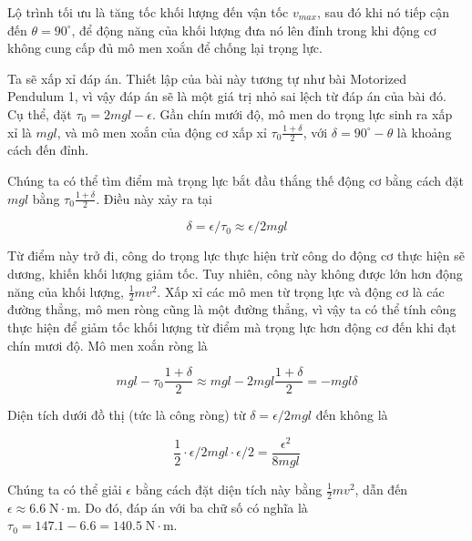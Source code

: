 \begin{solution}
    Lộ trình tối ưu là tăng tốc khối lượng đến vận tốc $v_{max}$, sau đó khi nó tiếp cận đến $\theta=90^{\circ}$, để động năng của khối lượng đưa nó lên đỉnh trong khi động cơ không cung cấp đủ mô men xoắn để chống lại trọng lực. 

    Ta sẽ xấp xỉ đáp án. Thiết lập của bài này tương tự như bài Motorized Pendulum 1, vì vậy đáp án sẽ là một giá trị nhỏ sai lệch từ đáp án của bài đó. Cụ thể, đặt $\tau_0 = 2mgl-\epsilon $. Gần chín mưới độ, mô men do trọng lực sinh ra xấp xỉ là $mgl$, và mô men xoắn của động cơ xấp xỉ $\tau_0 \frac{1+\delta}{2}$, với $\delta=90^{\circ} - \theta$ là khoảng cách đến đỉnh.

   Chúng ta có thể tìm điểm mà trọng lực bắt đầu thắng thế động cơ bằng cách đặt $mgl$ bằng $\tau_0 \frac{1+\delta}{2}$. Điều này xảy ra tại
    
    $$\delta=\epsilon/\tau_0 \approx \epsilon/2mgl$$
    
   Từ điểm này trở đi, công do trọng lực thực hiện trừ công do động cơ thực hiện sẽ dương, khiến khối lượng giảm tốc. Tuy nhiên, công này không được lớn hơn động năng của khối lượng, $\frac{1}{2}mv^2$. Xấp xỉ các mô men từ trọng lực và động cơ là các đường thẳng, mô men ròng cũng là một đường thẳng, vì vậy ta có thể tính công thực hiện để giảm tốc khối lượng từ điểm mà trọng lực hơn động cơ đến khi đạt chín mươi độ. Mô men xoắn ròng là 

    $$mgl-\tau_0 \frac{1+\delta}{2}\approx mgl-2mgl \frac{1+\delta}{2}=-mgl \delta $$

    Diện tích dưới đồ thị (tức là công ròng) từ $\delta=\epsilon/2mgl$ đến không là 

    $$\frac{1}{2} \cdot \epsilon/2mgl \cdot \epsilon/2 = \frac{\epsilon^2}{8mgl} $$

   Chúng ta có thể giải $\epsilon$ bằng cách đặt diện tích này bằng $\frac{1}{2} mv^2$, dẫn đến $\epsilon\approx6.6 \; \mathrm{N\cdot m}$. Do đó, đáp án với ba chữ số có nghĩa là $\boxed{\tau_0=147.1-6.6=140.5 \;\mathrm{N\cdot m}}$.
    

\end{solution}
